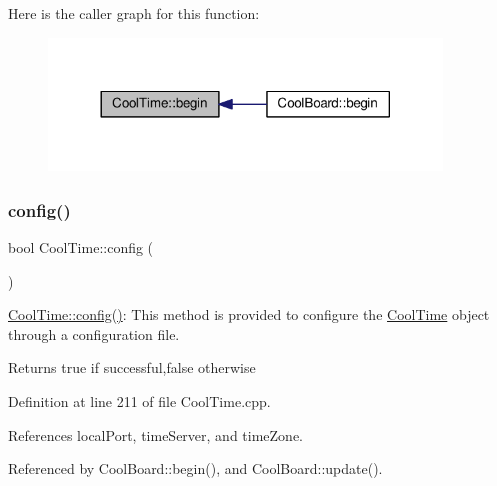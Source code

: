 Here is the caller graph for this function\+:
\nopagebreak
\begin{figure}[H]
\begin{center}
\leavevmode
\includegraphics[width=296pt]{classCoolTime_a2b36c4009f083ece2d407fec077c4938_icgraph}
\end{center}
\end{figure}
\mbox{\label{classCoolTime_a87c28260c1bc77091162cbcf1ee2e129}} 
\subsubsection{\texorpdfstring{config()}{config()}\hspace{0.1cm}{\footnotesize\ttfamily [1/2]}}
{\footnotesize\ttfamily bool Cool\+Time\+::config (\begin{DoxyParamCaption}{ }\end{DoxyParamCaption})}

\hyperlink{classCoolTime_a87c28260c1bc77091162cbcf1ee2e129}{Cool\+Time\+::config()}\+: This method is provided to configure the \hyperlink{classCoolTime}{Cool\+Time} object through a configuration file.

\begin{DoxyReturn}{Returns}
true if successful,false otherwise 
\end{DoxyReturn}


Definition at line 211 of file Cool\+Time.\+cpp.



References local\+Port, time\+Server, and time\+Zone.



Referenced by Cool\+Board\+::begin(), and Cool\+Board\+::update().



